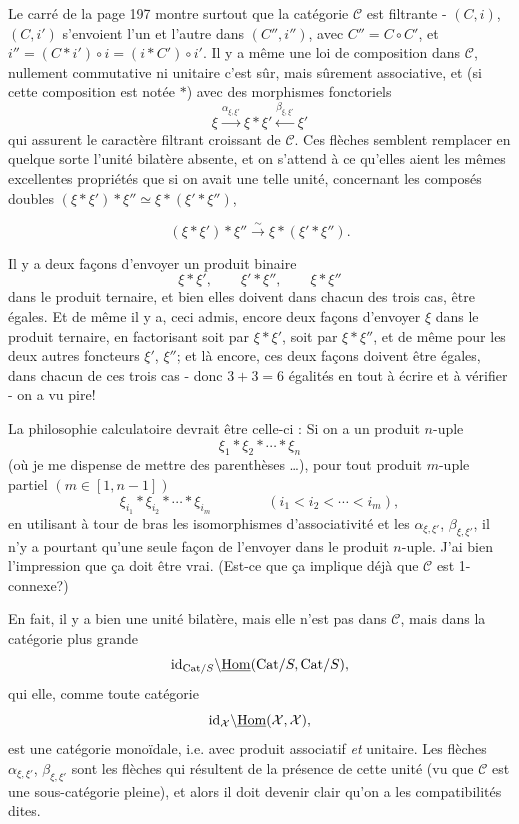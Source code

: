 Le carré de la page 197 montre surtout que la catégorie $\mathcal{C}$ est filtrante - $(C,i)$, $(C,i')$ s'envoient l'un et l'autre dans $(C'',i'')$, avec $C'' = C \circ C'$, et $i'' = (C * i') \circ i = (i * C') \circ i'$. Il y a même une loi de composition dans $\mathcal{C}$, nullement commutative ni unitaire c'est sûr, mais sûrement associative, et (si cette composition est notée $*$) avec des morphismes fonctoriels %
\[
\xi \xrightarrow{\alpha_{\xi,\xi'}} \xi * \xi' \xleftarrow{\beta_{\xi,\xi'}} \xi'
\]
qui assurent le caractère filtrant croissant de $\mathcal{C}$. Ces flèches semblent remplacer en quelque sorte l'unité bilatère absente, et on s'attend à ce qu'elles aient les mêmes excellentes propriétés que si on avait une telle unité, concernant les composés doubles $(\xi * \xi') * \xi'' \simeq \xi * (\xi' * \xi'')$,

\[
(\xi * \xi') * \xi'' \xrightarrow{\sim} \xi * (\xi' * \xi'').
\]

Il y a deux façons d'envoyer un produit binaire
\[
\xi * \xi', \qquad \xi' * \xi'', \qquad \xi * \xi''
\]
dans le produit ternaire, et bien elles doivent dans chacun des trois cas, être égales. Et de même il y a, ceci admis, encore deux façons d'envoyer $\xi$ dans le produit ternaire, en factorisant soit par $\xi * \xi'$, soit par $\xi * \xi''$, et de même pour les deux autres foncteurs $\xi'$, $\xi''$; et là encore, ces deux façons doivent être égales, dans chacun de ces trois cas - donc $3 + 3 = 6$ égalités en tout à écrire et à vérifier - on a vu pire!

La philosophie calculatoire devrait être celle-ci : Si on a un produit $n$-uple
\[
\xi_1 * \xi_2 * \cdots * \xi_n
\]
(où je me dispense de mettre des parenthèses \dots), pour tout produit $m$-uple partiel $(m \in [1, n-1])$
\[
\xi_{i_1} * \xi_{i_2} * \cdots * \xi_{i_m} \qquad\qquad (i_1 < i_2 < \cdots < i_m),
\]
en utilisant à tour de bras les isomorphismes d'associativité et les $\alpha_{\xi,\xi'}$, $\beta_{\xi,\xi'}$, il n'y a pourtant qu'une seule façon de l'envoyer dans le produit $n$-uple. J'ai bien l'impression que ça doit être vrai. (Est-ce que ça implique déjà que $\mathcal{C}$ est 1-connexe?)

En fait, il y a bien une unité bilatère, mais elle n'est pas dans $\mathcal{C}$, mais dans la catégorie plus grande
\[
\mathrm{id}_{\mathrm{Cat}/S}\backslash\underline{\mathrm{Hom}}(\mathrm{Cat}/S, \mathrm{Cat}/S),
\]
qui elle, comme toute catégorie
\[
\mathrm{id}_{\mathcal{X}}\backslash\underline{\mathrm{Hom}}(\mathcal{X}, \mathcal{X}),
\]
est une catégorie monoïdale, i.e. avec produit associatif \textit{et} unitaire. Les flèches $\alpha_{\xi,\xi'}$, $\beta_{\xi,\xi'}$ sont les flèches qui résultent de la présence de cette unité (vu que $\mathcal{C}$ est une sous-catégorie pleine), et alors il doit devenir clair qu'on a les compatibilités dites.

